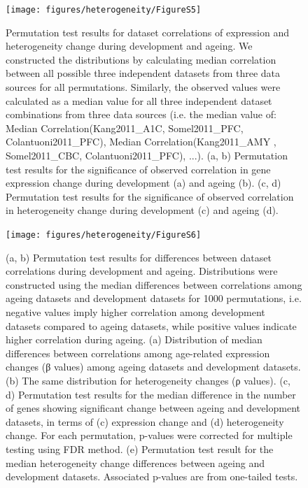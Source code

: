 \documentclass[12pt,twoside]{unicam}
\begin{document}
\begin{figure}

{\centering \texttt{[image: figures/heterogeneity/FigureS5]} 

}

\caption[Permutation test results for dataset correlations of expression and heterogeneity change during development and ageing.]{Permutation test results for dataset correlations of expression and heterogeneity change during development and ageing. We constructed the distributions by calculating median correlation between all possible three independent datasets from three data sources for all permutations. Similarly, the observed values were calculated as a median value for all three independent dataset combinations from three data sources (i.e. the median value of: Median Correlation(Kang2011\_A1C, Somel2011\_PFC, Colantuoni2011\_PFC), Median Correlation(Kang2011\_AMY , Somel2011\_CBC, Colantuoni2011\_PFC), ...). (a, b) Permutation test results for the significance of observed correlation in gene expression change during development (a) and ageing (b). (c, d) Permutation test results for the significance of observed correlation in heterogeneity change during development (c) and ageing (d).}\label{fig:hetFigS5}
\end{figure}

\begin{figure}

{\centering \texttt{[image: figures/heterogeneity/FigureS6]} 

}

\caption[Permutation test results for differences between dataset correlations, number of significant changes, and median heterogeneity changes during development and ageing.]{(a, b) Permutation test results for differences between dataset correlations during development and ageing. Distributions were constructed using the median differences between correlations among ageing datasets and development datasets for 1000 permutations, i.e. negative values imply higher correlation among development datasets compared to ageing datasets, while positive values indicate higher correlation during ageing. (a) Distribution of median differences between correlations among age-related expression changes (β values) among ageing datasets and development datasets. (b) The same distribution for heterogeneity changes (ρ values). (c, d) Permutation test results for the median difference in the number of genes showing significant change between ageing and development datasets, in terms of (c) expression change and (d) heterogeneity change. For each permutation, p-values were corrected for multiple testing using FDR method. (e) Permutation test result for the median heterogeneity change differences between ageing and development datasets. Associated p-values are from one-tailed tests.}\label{fig:hetFigS6}
\end{figure}
\end{document}

